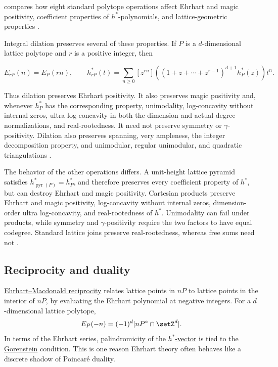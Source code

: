  compares how eight standard polytope operations affect
Ehrhart and magic positivity, coefficient properties of $h^*$-polynomials,
and lattice-geometric properties \cite[Table~1]{Liu2026EhrhartOperations}.

Integral dilation preserves several of these properties.  If $P$ is a
$d$-dimensional lattice polytope and $r$ is a positive integer, then

\[
  E_{rP}(n)=E_P(rn),
  \qquad
  h^*_{rP}(t)
  =\sum_{n\geq 0}[z^{rn}]
  \left((1+z+\dotsb+z^{r-1})^{d+1}h^*_P(z)\right)t^n.
\]

Thus dilation preserves Ehrhart positivity.  It also preserves magic
positivity and, whenever $h^*_P$ has the corresponding property,
unimodality, log-concavity without internal zeros, ultra log-concavity in
both the dimension and actual-degree normalizations, and real-rootedness.
It need not preserve symmetry or $\gamma$-positivity.  Dilation also preserves
spanning, very ampleness, the integer decomposition property, and
unimodular, regular unimodular, and quadratic triangulations
\cite[Sec.~9]{Liu2026EhrhartOperations}.

The behavior of the other operations differs.  A unit-height lattice pyramid
satisfies $h^*_{\operatorname{pyr}(P)}=h^*_P$, and therefore preserves every
coefficient property of $h^*$, but can destroy Ehrhart and magic positivity.
Cartesian products preserve Ehrhart and magic positivity, log-concavity
without internal zeros, dimension-order ultra log-concavity, and
real-rootedness of $h^*$.  Unimodality can fail under products, while
symmetry and $\gamma$-positivity require the two factors to have equal codegree.
Standard lattice joins preserve real-rootedness, whereas free sums need not
\cite[Secs.~2--5]{Liu2026EhrhartOperations}.

\subsection[ehrhartReciprocityHub]{Reciprocity and duality}

\hyperref[ehrhartMacdonaldReciprocity]{Ehrhart--Macdonald reciprocity} relates
lattice points in \(nP\) to lattice points in the interior of \(nP\), by
evaluating the Ehrhart polynomial at negative integers.  For a
\(d\)-dimensional lattice polytope,
\[
  E_P(-n)=(-1)^d |nP^\circ\cap \setZ^d|.
\]
In terms of the Ehrhart series, palindromicity of the
\hyperref[hStarVector]{\(h^*\)-vector} is tied to the
\hyperref[gorenstein]{Gorenstein} condition.  This is one reason Ehrhart
theory often behaves like a discrete shadow of Poincaré duality.

